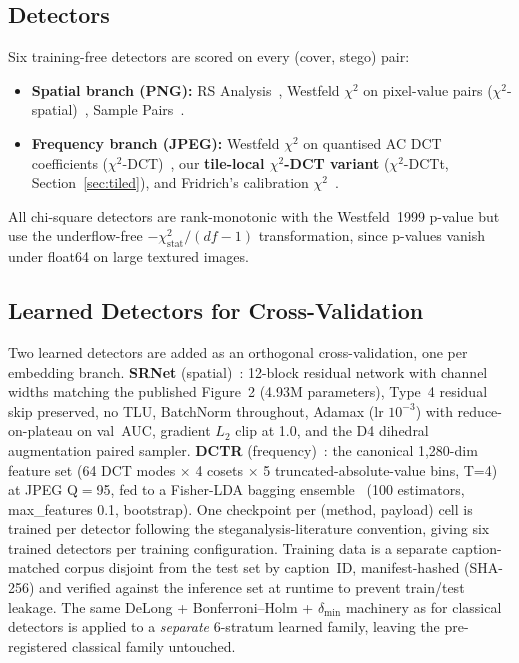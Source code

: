 \documentclass[10pt,twocolumn,a4paper]{article}
\begin{document}
\subsection{Detectors}
\label{sec:detectors}

Six training-free detectors are scored on every (cover, stego) pair:
\begin{itemize}
\item \textbf{Spatial branch (PNG):} RS Analysis~\cite{fridrich2001lsb}, Westfeld $\chi^2$ on pixel-value pairs ($\chi^2$-spatial)~\cite{westfeld1999chi}, Sample Pairs~\cite{dumitrescu2003sp}.
\item \textbf{Frequency branch (JPEG):} Westfeld $\chi^2$ on quantised AC DCT coefficients ($\chi^2$-DCT)~\cite{westfeld1999chi}, our \textbf{tile-local $\chi^2$-DCT variant} ($\chi^2$-DCTt, Section~\ref{sec:tiled}), and Fridrich's calibration $\chi^2$~\cite{fridrich2003calib}.
\end{itemize}

All chi-square detectors are rank-monotonic with the Westfeld~1999 p-value but use the underflow-free $-\chi^2_\text{stat}/(df\!-\!1)$ transformation, since p-values vanish under float64 on large textured images.

\subsection{Learned Detectors for Cross-Validation}
\label{sec:learned-detectors}
Two learned detectors are added as an orthogonal cross-validation, one per embedding branch. \textbf{SRNet} (spatial)~\cite{boroumand2019srnet}: 12-block residual network with channel widths matching the published Figure~2 (4.93M parameters), Type~4 residual skip preserved, no TLU, BatchNorm throughout, Adamax (lr $10^{-3}$) with reduce-on-plateau on val~AUC, gradient $L_2$ clip at 1.0, and the D4 dihedral augmentation paired sampler. \textbf{DCTR} (frequency)~\cite{holub2015dctr}: the canonical 1{,}280-dim feature set (64 DCT modes $\times$ 4 cosets $\times$ 5 truncated-absolute-value bins, T=4) at JPEG Q$=$95, fed to a Fisher-LDA bagging ensemble~\cite{fridrich2012srm} (100 estimators, max\_features 0.1, bootstrap). One checkpoint per (method, payload) cell is trained per detector following the steganalysis-literature convention, giving six trained detectors per training configuration. Training data is a separate caption-matched corpus disjoint from the test set by caption~ID, manifest-hashed (SHA-256) and verified against the inference set at runtime to prevent train/test leakage. The same DeLong + Bonferroni--Holm + $\delta_\text{min}$ machinery as for classical detectors is applied to a \emph{separate} 6-stratum learned family, leaving the pre-registered classical family untouched.
\end{document}
